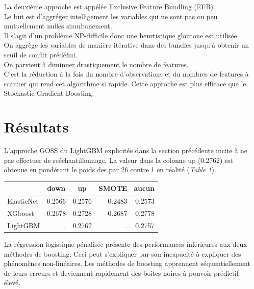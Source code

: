 \documentclass[french]{article}
\begin{document}
\begin{multicols}{2}
La deuxième approche est appélée Exclusive Feature Bundling (EFB)\footnotemark[14].\\
Le but est d'aggréger intelligement les variables qui ne sont pas ou peu mutuellement nulles simultanement.\\
Il s'agit d'un problème NP-difficile donc une heurtistique gloutone est utilisée.\\
On aggrège les variables de manière itérative dans des \og bundles \fg{} jusqu'à obtenir un seuil de conflit prédéfini.\\
On parvient à diminuer drastiquement le nombre de features.\\
C'est la réduction à la fois du nombre d'observations et du nombres de features à scanner qui rend cet algorithme si rapide. Cette approche est plus efficace que le Stochastic Gradient Boosting.







\section{Résultats}

L'approche GOSS du LightGBM explicitée dans la section précédente incite à ne pas effectuer de reéchantillonnage. La valeur dans la colonne \og up \fg{} (0.2762) est obtenue en pondérant le poids des  \fg{} par 26 contre 1 en réalité (\emph{Table 1}).

\begin{center}\begin{tabular}{|l|r|r|r|r|} \hline
  & \multicolumn{1}{c|}{down} & \multicolumn{1}{c|}{up} & \multicolumn{1}{c|}{SMOTE} & \multicolumn{1}{c|}{aucun} \\ \hline
  ElasticNet & 0.2566 & 0.2576 & 0.2483 & 0.2573 \\
  XGboost & 0.2678 & 0.2728 & 0.2687 & 0.2778 \\
  LightGBM & . & 0.2762 & . & 0.2757 \\ \hline

\end{tabular}\end{center}



La régression logistique pénalisée présente des performances inférieures aux deux méthodes de boosting. Ceci peut s'expliquer par son incapacité à expliquer des phénomènes non-linéaires. Les méthodes de boosting apprennent séquentiellement de leurs erreurs et deviennent rapidement des boîtes noires à pouvoir prédictif élevé.


\end{multicols}
\end{document}
